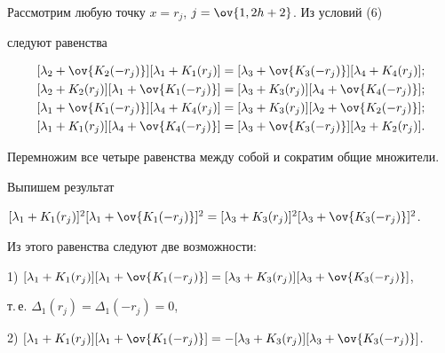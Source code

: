 \begin{pf} 


Рассмотрим любую точку $x=r_j$, $j=\ov{1,2h+2}$. Из условий (6) 


следуют равенства 


\begin{align*} 


[\lambda_2+\ov{K_2(-r_j)}] 


[\lambda_1+K_1(r_j)]&=[\lambda_3+\ov{K_3(-r_j)}] 


[\lambda_4+K_4(r_j)];\\ 


% 


[\lambda_2+K_2(r_j)][\lambda_1+\ov{K_1(-r_j)}]&= 


[\lambda_3+K_3(r_j)][\lambda_4+\ov{K_4(-r_j)}]; \\ 


% 


[\lambda_1+\ov{K_1(-r_j)}][\lambda_4+K_4(r_j)]&= 


[\lambda_3+K_3(r_j)][\lambda_2+\ov{K_2(-r_j)}];\\ 


% 


[\lambda_1+K_1(r_j)][\lambda_4+\ov{K_4(-r_j)}]&= 


[\lambda_3+\ov{K_3(-r_j)}] 


[\lambda_2+K_2(r_j)]. 


\end{align*} 


Перемножим все четыре равенства между собой и сократим общие множители. 


Выпишем результат 


$[\lambda_1+K_1(r_j)]^2[\lambda_1+\ov{K_1(-r_j)}]^2= 


[\lambda_3+K_3(r_j)]^2[\lambda_3+\ov{K_3(-r_j)}]^2$. 


Из этого равенства следуют две возможности: 


 


1) $[\lambda_1+K_1(r_j)][\lambda_1+\ov{K_1(-r_j)}]= 


[\lambda_3+K_3(r_j)][\lambda_3+\ov{K_3(-r_j)}]$, 


т.\,е. $\Delta_1(r_j)=\Delta_1(-r_j)=0$, 


 


2) $[\lambda_1+K_1(r_j)][\lambda_1+\ov{K_1(-r_j)}]= 


-[\lambda_3+K_3(r_j)][\lambda_3+\ov{K_3(-r_j)}]$. 



\end{pf}
